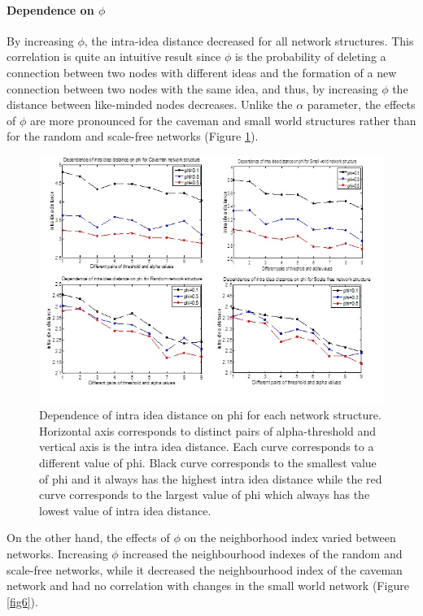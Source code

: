 \documentclass{beamer}
\begin{document}
\begin{frame}
\paragraph{Dependence on $\phi$}
By increasing $\phi$, the intra-idea distance decreased for all network structures. This correlation is quite an intuitive result since $\phi$ is the probability of deleting a connection between two nodes with different ideas and the formation of a new connection between two nodes with the same idea, and thus, by increasing $\phi$ the distance between like-minded nodes decreases. Unlike the $\alpha$ parameter, the effects of $\phi$ are more pronounced for the caveman and small world structures rather than for the random and scale-free networks (Figure \ref{fig5}).

\begin{figure}
[htp]
\begin{center}
\includegraphics{Fig5}
\end{center}
\caption{Dependence of intra idea distance on phi for each network structure. Horizontal axis corresponds to distinct pairs of alpha-threshold and   vertical axis is the intra idea distance. Each curve corresponds to a different value of phi. Black curve corresponds to the smallest value of phi and it always has the highest intra idea distance while the red curve corresponds to the largest value of phi which always has the lowest value of intra idea distance.}
\label {fig5}
\end{figure}

On the other hand, the effects of $\phi$ on the neighborhood index varied between networks. Increasing $\phi$ increased the neighbourhood indexes of the random and scale-free networks, while it decreased the neighbourhood index of the caveman network and had no correlation with changes in the small world network (Figure \ref{fig6}).


\end{frame}
\end{document}
